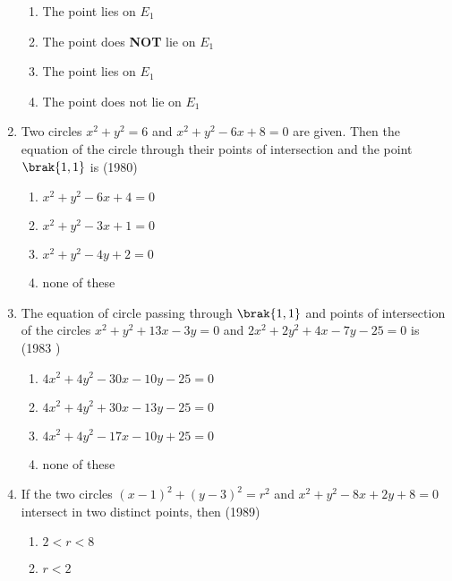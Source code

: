 \begin{enumerate}
%
\hfill{}
\begin{multicols}{2}
\begin{enumerate}
\item The point  lies on $E_1$
\item The point  does \textbf{NOT} lie on $E_1$
\item The point  lies on $E_1$
\item The point  does not lie on $E_1$
\end{enumerate}
\end{multicols}
    \item Two circles $x^{2} + y^{2} = 6$ and $x^{2} + y^{2}-6x +8=0$ are given. Then the equation of the circle through their points of intersection and the point $\brak{1, 1}$ is \hfill {(1980)}
    \begin{multicols}{2}
\begin{enumerate}
    	\item $x^{2}+y^{2}-6x+4=0$ 
    	\item $x^{2}+y^{2}-3x+1=0$
    	\item $x^{2}+y^{2}-4y+2=0$
    	\item none of these
    \end{enumerate}
\end{multicols}
    \item The equation of circle passing through $\brak{1, 1}$ and points of intersection of the circles $x^{2}+y^{2}+13x-3y=0$ and $2x^{2}+2y^{2}+4x-7y-25=0$ is
    \hfill {(1983 )}
    \begin{multicols}{2}
\begin{enumerate}
    	\item $4x^{2}+4y^{2}-30x-10y-25=0$
    	\item $4x^{2}+4y^{2}+30x-13y-25=0$
    	\item $4x^{2}+4y^{2}-17x-10y+25=0$
    	\item none of these
    \end{enumerate}
\end{multicols}
    \item If the two circles $(x-1)^{2} + (y-3)^{2} = r^{2}$ and $x^{2}+y^{2}-8x+2y+8=0$ intersect in two distinct points,  then \hfill {(1989)} 
    \begin{multicols}{2}
\begin{enumerate}
    	\item $2<r<8$
    	\item $r<2$

\end{enumerate}
\end{multicols}
\end{enumerate}
